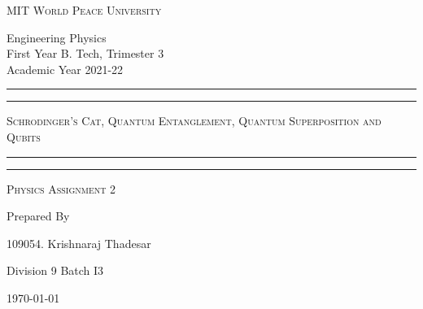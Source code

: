 \documentclass[11pt]{article}
\begin{document}
	
	\begin{titlepage} 
		\centering 
		
		
		\huge\textsc{
			MIT World Peace University
		}\\
	
		\vspace{0.75\baselineskip} %
		
		\LARGE{
			Engineering Physics\\
			First Year B. Tech, Trimester 3\\
			Academic Year 2021-22
		}
		
		\vfill %
		
		
		\rule{\textwidth}{1.6pt}\vspace*{-\baselineskip}\vspace*{2pt}
		\rule{\textwidth}{0.6pt}
		\vspace{0.75\baselineskip} %
		
		
		
		\huge{\textsc{
				Schrodinger's Cat, Quantum Entanglement, Quantum Superposition and Qubits
			}} \\
		
		
		
		\vspace{0.5\baselineskip} %
		\rule{\textwidth}{0.6pt}\vspace*{-\baselineskip}\vspace*{2.8pt}
		\rule{\textwidth}{1.6pt}
		
		\vspace{1\baselineskip} %

			
		\LARGE\textsc{
			Physics Assignment 2
		} %
		\vfill
		
		
		Prepared By
		\vspace{0.5\baselineskip} %
		
		\Large{
			109054. Krishnaraj Thadesar
						
			Division 9 Batch I3
		}
		
		
		\vspace{0.5\baselineskip} %
		\today

	\end{titlepage}
	
\end{document}
